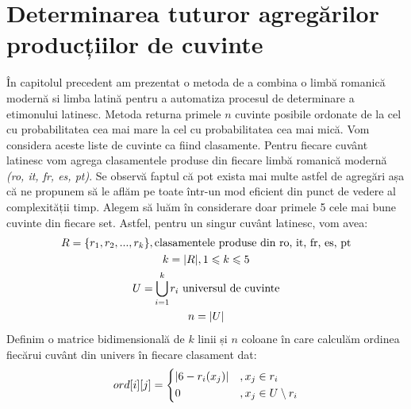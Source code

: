 \section{Determinarea tuturor agregărilor producțiilor de cuvinte}
În capitolul precedent am prezentat o metoda de a combina o limbă romanică modernă si limba latină
pentru a automatiza procesul de determinare a etimonului latinesc. Metoda returna primele $n$
cuvinte posibile ordonate de la cel cu probabilitatea cea mai mare la cel cu probabilitatea cea mai
mică. Vom considera aceste liste de cuvinte ca fiind clasamente. Pentru fiecare cuvânt latinesc vom
agrega clasamentele produse din fiecare limbă romanică modernă \textit{(ro, it, fr, es, pt)}.
Se observă faptul că pot exista mai multe astfel de agregări așa că ne propunem să le aflăm pe toate
într-un mod eficient din punct de vedere al complexității timp. Alegem să luăm în considerare
doar primele 5 cele mai bune cuvinte din fiecare set. Astfel, pentru un singur cuvânt latinesc, vom 
avea:
\begin{gather*}
  R = \{r_1, r_2, ..., r_k\}, \text{clasamentele produse din ro, it, fr, es, pt} \\
  k = |R|, 1 \leqslant k \leqslant 5 \\
  U = \smashoperator{\bigcup_{i = 1}^{k}} r_i \text{ universul de cuvinte} \\
  n = |U|
\end{gather*}
Definim o matrice bidimensională de $k$ linii și $n$ coloane în care calculăm ordinea fiecărui 
cuvânt din univers în fiecare clasament dat:
\[
  ord[i][j] = \begin{dcases}
    |6 - r_i(x_j)|    &, x_j \in r_i \\
    0                 &, x_j \in U \setminus r_i 
  \end{dcases}
\]
